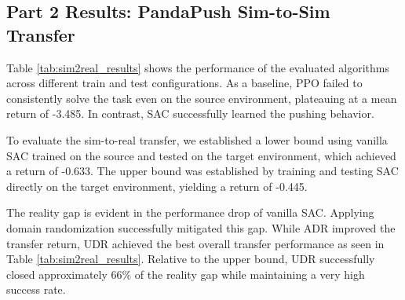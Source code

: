 \subsection{Part 2 Results: PandaPush Sim-to-Sim Transfer}
Table \ref{tab:sim2real_results} shows the performance of the evaluated algorithms across different train and test configurations. 
As a baseline, PPO failed to consistently solve the task even on the source environment, plateauing at a mean return of -3.485. In contrast, SAC successfully learned the pushing behavior.

To evaluate the sim-to-real transfer, we established a lower bound using vanilla SAC trained on the source and tested on the target environment, which achieved a return of -0.633. The upper bound was established by training and testing SAC directly on the target environment, yielding a return of -0.445. 

The reality gap is evident in the performance drop of vanilla SAC. 
Applying domain randomization successfully mitigated this gap. While ADR improved the transfer return, 
UDR achieved the best overall transfer performance as seen in Table \ref{tab:sim2real_results}.
Relative to the upper bound, UDR successfully closed approximately 66\% of the reality gap while maintaining a very high success rate.

\begin{table}[h]
\centering
{}
\caption{Performance comparison across training strategies and evaluation domains (mean $\pm$ std over 3 seeds, 200 episodes per seed).}
\label{tab:sim2real_results}
\end{table}
